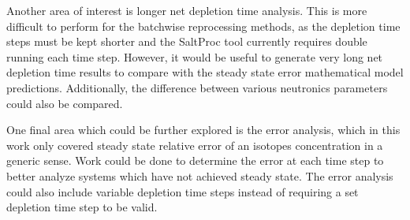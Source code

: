 Another area of interest is longer net depletion time analysis. This is more difficult to perform for the batchwise reprocessing methods, as the depletion time steps must be kept shorter and the SaltProc tool currently requires double running each time step. However, it would be useful to generate very long net depletion time results to compare with the steady state error mathematical model predictions. Additionally, the difference between various neutronics parameters could also be compared.

One final area which could be further explored is the error analysis, which in this work only covered steady state relative error of an isotopes concentration in a generic sense. Work could be done to determine the error at each time step to better analyze systems which have not achieved steady state. The error analysis could also include variable depletion time steps instead of requiring a set depletion time step to be valid. 

